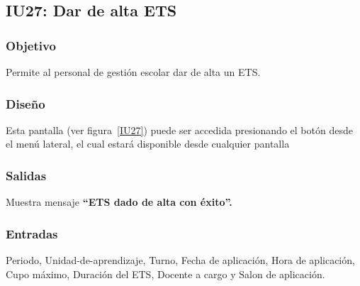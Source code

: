 
\subsection{IU27: Dar de alta ETS}
\subsubsection{Objetivo}
    Permite al personal de gestión escolar dar de alta un ETS.
\subsubsection{Diseño}
    Esta pantalla  (ver figura~\ref{IU27}) puede ser accedida presionando el botón  desde el menú lateral, el cual estará disponible desde cualquier pantalla

\subsubsection{Salidas}
Muestra mensaje {\bf ``ETS  dado de alta con éxito''.}
\subsubsection{Entradas}
Periodo, Unidad-de-aprendizaje, Turno, Fecha de aplicación, Hora de aplicación, Cupo máximo, Duración del ETS, Docente a cargo y Salon de aplicación.

